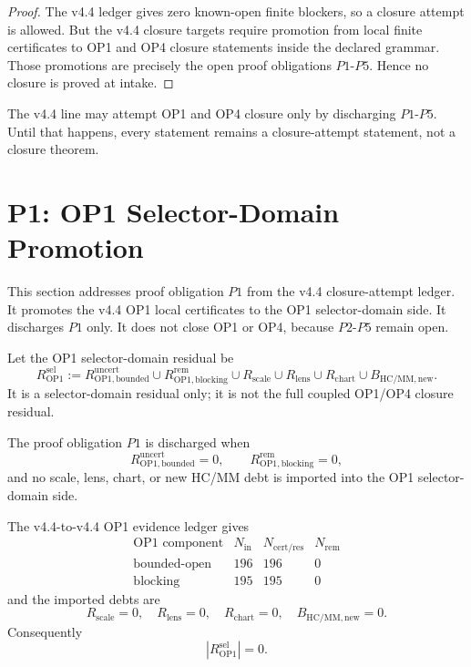 \begin{proof}
The v4.4 ledger gives zero known-open finite blockers, so a closure attempt is
allowed.  But the v4.4 closure targets require promotion from local finite
certificates to OP1 and OP4 closure statements inside the declared grammar.
Those promotions are precisely the open proof obligations \(P1\)-\(P5\).
Hence no closure is proved at intake.
\end{proof}

\begin{theorem}
The v4.4 line may attempt OP1 and OP4 closure only by discharging \(P1\)-\(P5\).
Until that happens, every statement remains a closure-attempt statement, not a
closure theorem.
\end{theorem}



\section{P1: OP1 Selector-Domain Promotion}
\label{sec:v45-p1-op1-selector-domain-promotion}

This section addresses proof obligation \(P1\) from the v4.4 closure-attempt
ledger.  It promotes the v4.4 OP1 local certificates to the OP1
selector-domain side.  It discharges \(P1\) only.  It does not close OP1 or
OP4, because \(P2\)-\(P5\) remain open.

\begin{definition}
Let the OP1 selector-domain residual be
\[
    R_{\mathrm{OP1}}^{\mathrm{sel}}
    :=
    R_{\mathrm{OP1,bounded}}^{\mathrm{uncert}}
    \cup
    R_{\mathrm{OP1,blocking}}^{\mathrm{rem}}
    \cup
    R_{\mathrm{scale}}
    \cup
    R_{\mathrm{lens}}
    \cup
    R_{\mathrm{chart}}
    \cup
    B_{\mathrm{HC/MM,new}}.
\]
It is a selector-domain residual only; it is not the full coupled OP1/OP4
closure residual.
\end{definition}

\begin{definition}
The proof obligation \(P1\) is discharged when
\[
    R_{\mathrm{OP1,bounded}}^{\mathrm{uncert}}=0,\qquad
    R_{\mathrm{OP1,blocking}}^{\mathrm{rem}}=0,
\]
and no scale, lens, chart, or new HC/MM debt is imported into the OP1
selector-domain side.
\end{definition}

\begin{proposition}
The v4.4-to-v4.4 OP1 evidence ledger gives
\[
\begin{array}{c|r|r|r}
\text{OP1 component} & N_{\mathrm{in}} & N_{\mathrm{cert/res}} &
N_{\mathrm{rem}}\\
\hline
\mathrm{bounded\text{-}open} & 196 & 196 & 0\\
\mathrm{blocking} & 195 & 195 & 0
\end{array}
\]
and the imported debts are
\[
    R_{\mathrm{scale}}=0,\quad
    R_{\mathrm{lens}}=0,\quad
    R_{\mathrm{chart}}=0,\quad
    B_{\mathrm{HC/MM,new}}=0.
\]
Consequently
\[
    |R_{\mathrm{OP1}}^{\mathrm{sel}}|=0.
\]
\end{proposition}


